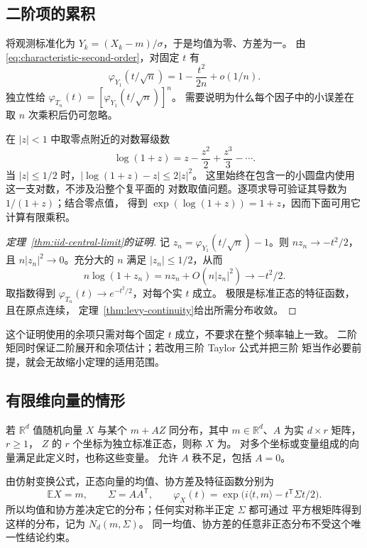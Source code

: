 \subsection{二阶项的累积}

将观测标准化为 $Y_k=(X_k-m)/\sigma$，于是均值为零、方差为一。
由\eqref{eq:characteristic-second-order}，对固定 $t$ 有
\[
 \varphi_{Y_1}(t/\sqrt n)=1-\frac{t^2}{2n}+o(1/n).
\]
独立性给
$\varphi_{T_n}(t)=[\varphi_{Y_1}(t/\sqrt n)]^n$。
需要说明为什么每个因子中的小误差在取 $n$ 次乘积后仍可忽略。

在 $|z|<1$ 中取零点附近的对数幂级数
\[
 \log(1+z)=z-\frac{z^2}2+\frac{z^3}3-\cdots.
\]
当 $|z|\le1/2$ 时，$|\log(1+z)-z|\le2|z|^2$。
这里始终在包含一的小圆盘内使用这一支对数，不涉及沿整个复平面的
对数取值问题。逐项求导可验证其导数为 $1/(1+z)$；结合零点值，
得到 $\exp(\log(1+z))=1+z$，因而下面可用它计算有限乘积。

\begin{proof}[定理~\ref{thm:iid-central-limit}的证明]
记 $z_n=\varphi_{Y_1}(t/\sqrt n)-1$。则
$nz_n\to-t^2/2$，且 $n|z_n|^2\to0$。充分大的 $n$ 满足
$|z_n|\le1/2$，从而
\[
 n\log(1+z_n)=nz_n+O(n|z_n|^2)\longrightarrow-t^2/2.
\]
取指数得到 $\varphi_{T_n}(t)\to e^{-t^2/2}$，对每个实 $t$ 成立。
极限是标准正态的特征函数，且在原点连续，
定理~\ref{thm:levy-continuity}给出所需分布收敛。
\end{proof}

这个证明使用的余项只需对每个固定 $t$ 成立，不要求在整个频率轴上一致。
二阶矩同时保证二阶展开和余项估计；若改用三阶 Taylor 公式并把三阶
矩当作必要前提，就会无故缩小定理的适用范围。

\subsection{有限维向量的情形}

\begin{definition}
\label{def:gaussian-random-vector}
若 $\mathbb R^d$ 值随机向量 $X$ 与某个 $m+AZ$ 同分布，其中
$m\in\mathbb R^d$、$A$ 为实 $d\times r$ 矩阵，$r\ge1$，
$Z$ 的 $r$ 个坐标为独立标准正态，则称 $X$ 为。
对多个坐标或变量组成的向量满足此定义时，也称这些变量。
允许 $A$ 秩不足，包括 $A=0$。
\end{definition}

由仿射变换公式，正态向量的均值、协方差及特征函数分别为
\begin{equation}
\label{eq:gaussian-vector-characteristic}
 \mathbb EX=m,\qquad \Sigma=AA^{\mathsf T},\qquad
 \varphi_X(t)=\exp\bigl(i\langle t,m\rangle-t^{\mathsf T}\Sigma t/2\bigr).
\end{equation}
所以均值和协方差决定它的分布；任何实对称半正定 $\Sigma$ 都可通过
平方根矩阵得到这样的分布，记为 $N_d(m,\Sigma)$。
同一均值、协方差的任意非正态分布不受这个唯一性结论约束。

